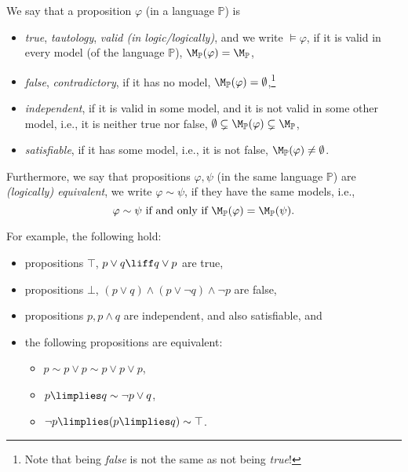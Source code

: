 \begin{definition}\label{definition:semantic-notions}
We say that a proposition $\varphi$ (in a language $\mathbb P$) is
\begin{itemize}
    \item \emph{true}, \emph{tautology}, \emph{valid (in logic/logically)}, and we write $\models \varphi$, if it is valid in every model (of the language $\mathbb P$), $\M_\mathbb P(\varphi) = \M_\mathbb P$,
    \item \emph{false}, \emph{contradictory}, if it has no model, $\M_\mathbb P(\varphi) = \emptyset$,\footnote{Note that being \emph{false} is not the same as not being \emph{true}!}
    \item \emph{independent}, if it is valid in some model, and it is not valid in some other model, i.e., it is neither true nor false, $\emptyset \subsetneq \M_\mathbb P(\varphi) \subsetneq \M_\mathbb P$,
    \item \emph{satisfiable}, if it has some model, i.e., it is not false, $\M_\mathbb P(\varphi) \neq \emptyset$.
\end{itemize}
Furthermore, we say that propositions $\varphi, \psi$ (in the same language $\mathbb P$) are \emph{(logically) equivalent}, we write $\varphi \sim \psi$, if they have the same models, i.e.,
$$
\varphi \sim \psi \text{ if and only if } \M_\mathbb P(\varphi) = \M_\mathbb P(\psi).
$$    
\end{definition}

\begin{example} For example, the following hold:
    \begin{itemize}
        \item propositions $\top$, $p \lor q \liff q \lor p$ are true,
        \item propositions $\bot$, $(p \lor q) \land (p \lor \neg q) \land \neg p$ are false,
        \item propositions $p, p \land q$ are independent, and also satisfiable, and
        \item the following propositions are equivalent: 
        \begin{itemize}
            \item $p \sim p \lor p \sim p \lor p \lor p$,
            \item $p \limplies q \sim \neg p \lor q$,
            \item $\neg p \limplies (p \limplies q) \sim \top $.
        \end{itemize}  
    \end{itemize}      
\end{example}

